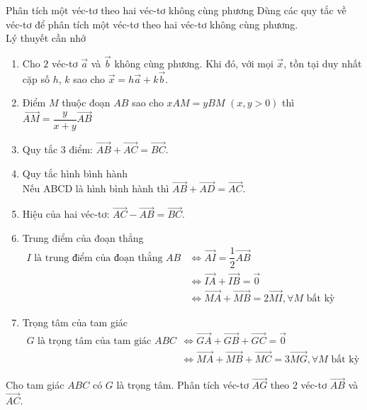 \begin{dang}%
{Phân tích một véc-tơ theo hai véc-tơ không cùng phương}
Dùng các quy tắc về véc-tơ để phân tích một véc-tơ theo hai véc-tơ không cùng phương.\\
Lý thuyết cần nhớ
\begin{enumerate}[-]
\item Cho $2$ véc-tơ $\vec{a}$ và $\vec{b}$ không cùng phương. Khi đó, với mọi $\vec{x}$, tồn tại duy nhất cặp số $h$, $k$ sao cho $\vec{x}=h\vec{a}+k\vec{b}$.
\item Điểm $M$ thuộc đoạn $AB$ sao cho $xAM=yBM$ $(x,y>0)$ thì $\vec{AM}=\dfrac{y}{x+y}\vec{AB}$
\item Quy tắc $3$ điểm: $\vec{AB}+\vec{AC}=\vec{BC}$.
\item Quy tắc hình bình hành\\
Nếu ABCD là hình bình hành thì $\vec{AB}+\vec{AD}=\vec{AC}$.
\item Hiệu của hai véc-tơ: $\vec{AC}-\vec{AB}=\vec{BC}$.
\item Trung điểm của đoạn thẳng\\$\begin{array}{ll}I\text{\ là trung điểm của đoạn thẳng\ } AB&\Leftrightarrow \vec{AI}=\dfrac{1}{2}\vec{AB}\\&\Leftrightarrow \vec{IA}+\vec{IB}=\vec{0}\\&\Leftrightarrow \vec{MA}+\vec{MB}=2\vec{MI},\forall M \text{\ bất kỳ}\end{array}$
\item Trọng tâm của tam giác\\$\begin{array}{ll}G \text{\ là trọng tâm của tam giác\ } ABC&\Leftrightarrow \vec{GA}+\vec{GB}+\vec{GC}=\vec{0}\\&\Leftrightarrow \vec{MA}+\vec{MB}+\vec{MC}=3\vec{MG},\forall M \text{\ bất kỳ}\end{array}$
\end{enumerate}
\end{dang}

\begin{vd}%
Cho tam giác $ABC$ có $G$ là trọng tâm. Phân tích véc-tơ $\vec{AG}$ theo $2$ véc-tơ $\vec{AB}$ và $\vec{AC}$.
\end{vd}

